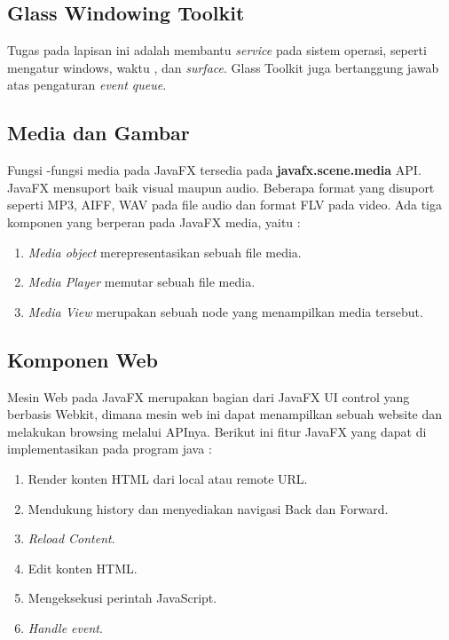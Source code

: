 \subsection{Glass Windowing Toolkit}
\label{subs:Glass_Windowing_Toolkit}
Tugas pada lapisan ini adalah membantu \textit{service} pada sistem operasi, seperti mengatur windows, waktu , dan \textit{surface}. Glass Toolkit juga bertanggung jawab atas pengaturan \textit{event queue}.\cite{javafx}

\subsection{Media dan Gambar}
\label{subs:Media_Gambar}
Fungsi -fungsi media pada JavaFX tersedia pada \textbf{javafx.scene.media} API. JavaFX mensuport baik visual maupun audio. Beberapa format yang disuport seperti MP3, AIFF, WAV pada file audio dan format FLV pada video. Ada tiga komponen yang berperan pada JavaFX media, yaitu :\cite{javafx} 
\begin{enumerate}
	\item \textit{Media object} merepresentasikan sebuah file media.
	\item \textit{Media Player} memutar sebuah file media.
	\item \textit{Media View} merupakan sebuah node yang menampilkan media tersebut.
\end{enumerate}

\subsection{Komponen Web}
\label{subs:Komponen_Web}
Mesin Web pada JavaFX merupakan bagian dari JavaFX UI control yang berbasis Webkit, dimana mesin web ini dapat menampilkan sebuah website dan melakukan browsing melalui APInya. Berikut ini fitur JavaFX yang dapat di implementasikan pada program java :\cite{javafx}
\begin{enumerate}
	\item Render konten HTML dari local atau remote URL.
	\item Mendukung history dan menyediakan navigasi Back dan Forward.
	\item \textit{Reload Content}.
	\item Edit konten HTML.
	\item Mengeksekusi perintah JavaScript.
	\item \textit{Handle event}.
\end{enumerate} 

